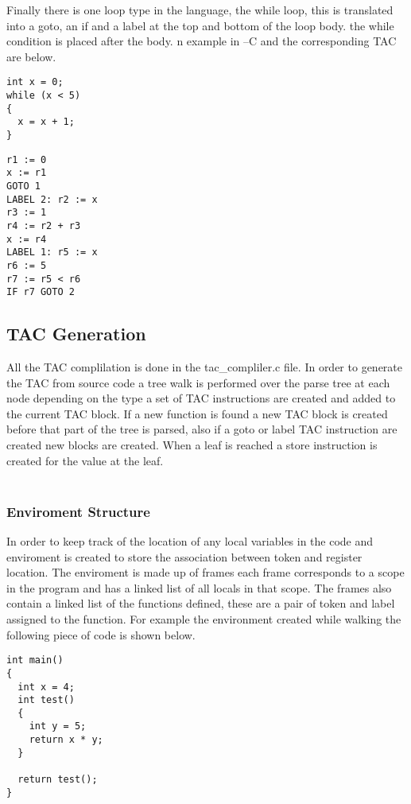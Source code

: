 \documentclass{article}
\begin{document}
Finally there is one loop type in the language, the while loop, this is translated
into a goto, an if and a label at the top and bottom of the loop body. the while
condition is placed after the body. n example in --C and the corresponding TAC
are below.

\begin{lstlisting}
int x = 0;
while (x < 5)
{
  x = x + 1;
}
\end{lstlisting}

\begin{lstlisting}
r1 := 0
x := r1
GOTO 1
LABEL 2: r2 := x
r3 := 1
r4 := r2 + r3
x := r4
LABEL 1: r5 := x
r6 := 5
r7 := r5 < r6
IF r7 GOTO 2
\end{lstlisting}

\subsection{TAC Generation}

All the TAC complilation is done in the tac\_compliler.c file.
In order to generate the TAC from source code a tree walk is performed over the
parse tree at each node depending on the type a set of TAC instructions are created
and added to the current TAC block. If a new function is found a new TAC block is
created before that part of the tree is parsed, also if a goto or label TAC instruction
are created new blocks are created. When a leaf is reached a store instruction is
created for the value at the leaf.\\~\\

\subsubsection{Enviroment Structure}

In order to keep track of the location of any local variables in the code and enviroment
is created to store the association between token and register location. The enviroment
is made up of frames each frame corresponds to a scope in the program and has
a linked list of all locals in that scope. The frames also contain a linked list of
the functions defined, these are a pair of token and label assigned to the function.
For example the environment created while walking the following piece of code is shown below.

\begin{lstlisting}
int main()
{
  int x = 4;
  int test()
  {
    int y = 5;
    return x * y;
  }

  return test();
}
\end{lstlisting}
\end{document}
